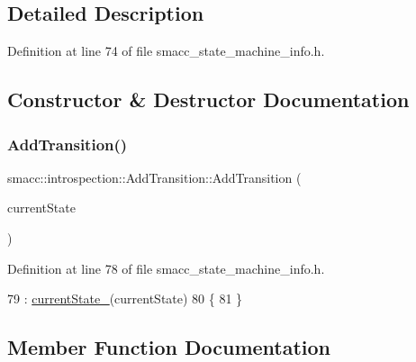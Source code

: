 \subsection{Detailed Description}


Definition at line 74 of file smacc\+\_\+state\+\_\+machine\+\_\+info.\+h.



\subsection{Constructor \& Destructor Documentation}
\mbox{\label{structsmacc_1_1introspection_1_1AddTransition_a7bec012404747e4ab3eb6ca32cf06ba7}} 
\subsubsection{\texorpdfstring{Add\+Transition()}{AddTransition()}}
{\footnotesize\ttfamily smacc\+::introspection\+::\+Add\+Transition\+::\+Add\+Transition (\begin{DoxyParamCaption}\item[{std\+::shared\+\_\+ptr$<$ \hyperlink{classsmacc_1_1introspection_1_1SmaccStateInfo}{Smacc\+State\+Info} $>$ \&}]{current\+State }\end{DoxyParamCaption})\hspace{0.3cm}{\ttfamily [inline]}}



Definition at line 78 of file smacc\+\_\+state\+\_\+machine\+\_\+info.\+h.


\begin{DoxyCode}
79         : \hyperlink{structsmacc_1_1introspection_1_1AddTransition_a56fd9b1bdf6761bbe5258dc915481f4b}{currentState\_}(currentState)
80     \{
81     \}
\end{DoxyCode}


\subsection{Member Function Documentation}
\mbox{\label{structsmacc_1_1introspection_1_1AddTransition_a40896e3e99a230be221d1a9733cb5e50}} 
